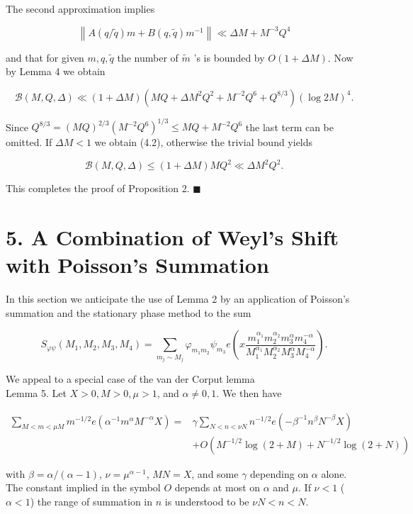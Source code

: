 \documentclass[10pt]{article}
\newcommand{\proofend}{\hfill\(\blacksquare\)}
\begin{document}
The second approximation implies


\begin{equation*}
\left\|A(q / \tilde{q}) m+B(q,\tilde q)m^{-1}\right\| \ll \Delta M+M^{-3} Q^{4} \tag{4.3}
\end{equation*}


and that for given $m, q, \tilde{q}$ the number of $\tilde{m}$ 's is bounded by $O(1+\Delta M)$. Now by Lemma 4 we obtain

$$
\mathscr{B}(M, Q, \Delta) \ll(1+\Delta M)\left(M Q+\Delta M^{2} Q^{2}+M^{-2} Q^{6}+Q^{8 / 3}\right)(\log 2 M)^{4} .
$$

Since $Q^{8 / 3}=(M Q)^{2 / 3}\left(M^{-2} Q^{6}\right)^{1 / 3} \leqslant M Q+M^{-2} Q^{6}$ the last term can be omitted. If $\Delta M<1$ we obtain (4.2), otherwise the trivial bound yields

$$
\mathscr{B}(M,Q,\Delta)\leqslant(1+\Delta M)MQ^{2} \ll \Delta M^{2} Q^{2} .
$$

This completes the proof of Proposition 2. \proofend

\section*{5. A Combination of Weyl's Shift with Poisson's Summation}
In this section we anticipate the use of Lemma 2 by an application of Poisson's summation and the stationary phase method to the sum

$$
S_{\varphi\psi}\left(M_{1}, M_{2}, M_{3}, M_{4}\right)=\sum_{m_{j}\sim M_{j}} \varphi_{m_{1} m_{2}} \psi_{m_{3}} e\left(x \frac{m_{1}^{\alpha_{1}} m_{2}^{\alpha_{2}} m_{3}^{\alpha} m_{4}^{-\alpha}}{M_{1}^{\alpha_{1}} M_{2}^{\alpha_{2}} M_{3}^{\alpha} M_{4}^{-\alpha}}\right) .
$$

We appeal to a special case of the van der Corput lemma\\
Lemma 5. Let $X>0, M>0, \mu>1$, and $\alpha\neq0,1$. We then have

$$
\begin{aligned}
\sum_{M<m<\mu M} m^{-1 / 2} e\left(\alpha^{-1} m^{\alpha} M^{-\alpha} X\right)= & \gamma \sum_{N<n<\nu N} n^{-1 / 2} e\left(-\beta^{-1} n^{\beta} N^{-\beta} X\right) \\
& +O\left(M^{-1 / 2} \log (2+M)+N^{-1 / 2} \log (2+N)\right)
\end{aligned}
$$

with $\beta=\alpha/(\alpha-1)$, $\nu=\mu^{\alpha-1}$, $MN=X$, and some $\gamma$ depending on $\alpha$ alone. The constant implied in the symbol $O$ depends at most on $\alpha$ and $\mu$. If $\nu<1$ ($\alpha<1$) the range of summation in $n$ is understood to be $\nu N<n<N$.
\end{document}
